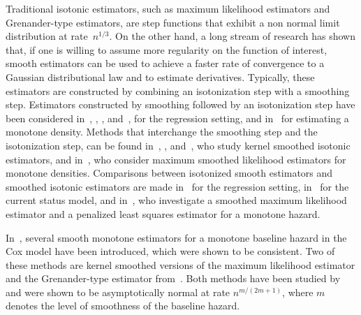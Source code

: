 \documentclass[11pt,reqno]{amsart}
\theoremstyle{definition}
\theoremstyle{plain}
\theoremstyle{remark}
\begin{document}
Traditional isotonic estimators, such as maximum likelihood estimators and Grenander-type estimators,
are step functions that exhibit a non normal limit distribution at rate~$n^{1/3}$.
On the other hand, a long stream of research has shown that,
if one is willing to assume more regularity on the function of interest,
smooth estimators can be used to achieve a faster rate of convergence to a Gaussian distributional law and to estimate derivatives.
Typically, these estimators are constructed by combining an isotonization step with a smoothing step.
Estimators constructed by smoothing followed by an isotonization step have been considered
in~\cite{chenglin1981}, \cite{wright1982}, \cite{friedmantibshirani1984}, and~\cite{ramsay1998}, for the regression setting,
and in~\cite{vdvaart-vdlaan2003} for estimating a monotone density.
Methods that interchange the smoothing step and the isotonization step,
can be found in~\cite{mukerjee1988}, \cite{DGL13}, and~\cite{LM15}, who study kernel smoothed isotonic estimators,
and in~\cite{eggermont-lariccia2000}, who consider maximum smoothed likelihood estimators for monotone densities.
Comparisons between isotonized smooth estimators and smoothed isotonic estimators are made in~\cite{mammen1991} for the regression setting,
in~\cite{GJW10} for the current status model,
and in~\cite{GJ13}, who investigate a smoothed maximum likelihood estimator and a penalized least squares estimator for a monotone hazard.

In~\cite{Nane}, several smooth monotone estimators for a monotone baseline hazard in the Cox model have been introduced, which were shown to be consistent.
Two of these methods are kernel smoothed versions of the maximum likelihood estimator and the Grenander-type estimator from~\cite{LopuhaaNane2013}.
Both methods have been studied by~\cite{LopuhaaMustaSI2016} and were shown to be asymptotically normal at rate $n^{m/(2m+1)}$,
where $m$ denotes the level of smoothness of the baseline hazard.
\end{document}
